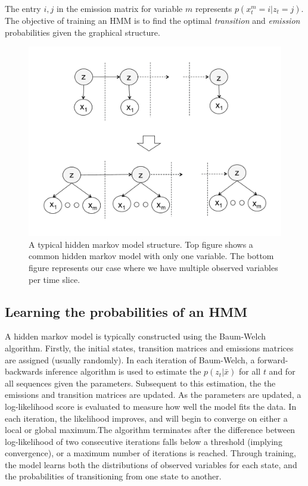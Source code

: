 The entry $i,j$ in the emission matrix for variable $m$ represents $p(x_t^m=i | z_t=j)$. The objective of training an HMM is to find the optimal \textit{transition} and \textit{emission} probabilities given the graphical structure. 
\begin{figure}[ht!]
  \caption{A typical hidden markov model structure. Top figure shows a common hidden markov model with only one variable. The bottom figure represents our case where we have multiple observed variables per time slice.}\label{fig:hmm}
  \centering
    \includegraphics[width=1.0\textwidth]{figures/one-vs-multi}
\end{figure}

\subsection{Learning the probabilities of an HMM}
A hidden markov model is typically constructed using the Baum-Welch algorithm. Firstly, the initial states, transition matrices and emissions matrices are assigned (usually randomly). In each iteration of Baum-Welch, a forward-backwards inference algorithm is used to estimate the $p(z_t|\bar{x})$ for all $t$ and for all sequences given the parameters. Subsequent to this estimation, the 
 the emissions and transition matrices are updated.  As the parameters are updated, a log-likelihood score is evaluated to measure how well the model fits the data. In each iteration, the likelihood improves, and will begin to converge on either a local or global maximum.The algorithm terminates after the difference between log-likelihood of two consecutive iterations falls below a threshold (implying convergence), or a maximum number of iterations is reached. Through training, the model learns both the distributions of observed variables for each state, and the probabilities of transitioning from one state to another.

